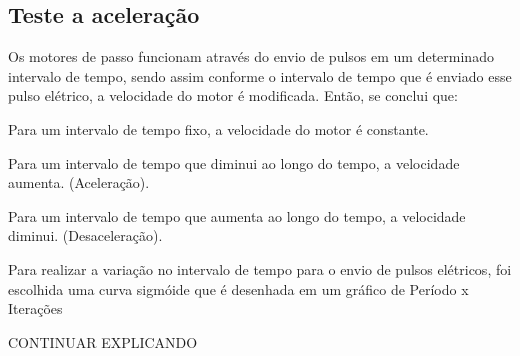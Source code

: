 \subsection{Teste a aceleração}
Os motores de passo funcionam através do envio de pulsos em um determinado intervalo de tempo, sendo assim 
conforme o intervalo de tempo que é enviado esse pulso elétrico, a velocidade do motor é modificada. Então, 
se conclui que:

\begin{alineas}
    \item Para um intervalo de tempo fixo, a velocidade do motor é constante.
    \item Para um intervalo de tempo que diminui ao longo do tempo, a velocidade aumenta. (Aceleração). 
    \item Para um intervalo de tempo que aumenta ao longo do tempo, a velocidade diminui. (Desaceleração).
    \item Para realizar a variação no intervalo de tempo para o envio de pulsos elétricos, foi escolhida 
    uma curva sigmóide que é desenhada em um gráfico de Período x Iterações
\end{alineas}

CONTINUAR EXPLICANDO